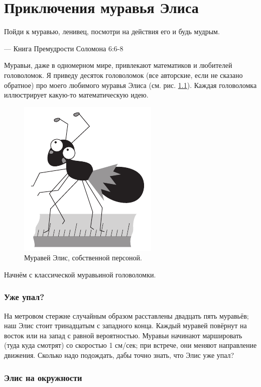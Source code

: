 \chapter{Приключения муравья Элиса}


\setlength{\epigraphwidth}{.67\textwidth}
\epigraph{Пойди к муравью, ленивец, посмотри на действия его и будь мудрым.
}{--- Книга Премудрости Соломона 6:6-8} 

Муравьи, даже в одномерном мире, привлекают математиков и любителей головоломок.
Я приведу десяток головоломок (все авторские, если не сказано обратное) про моего любимого муравья Элиса
(см. рис. \ref{pic:alice1}).
Каждая головоломка иллюстрирует какую-то математическую идею.

\begin{figure}[ht!]
\centering
\includegraphics[scale=.7]{pics/alice1}
\caption{Муравей Элис, собственной персоной.}
\label{pic:alice1}
\end{figure}

Начнём с классической муравьиной головоломки.

\subsection*{Уже упал?}\label{Уже упал?}

На метровом стержне случайным образом расставлены двадцать пять муравьёв; наш Элис стоит тринадцатым с западного конца.
Каждый муравей повёрнут на восток или на запад с равной вероятностью.
Муравьи начинают маршировать (туда куда смотрят) со скоростью 1 см/сек;
при встрече, они меняют направление движения.
Сколько надо подождать, дабы точно знать, что Элис уже упал?

\subsection*{Элис на окружности}\label{Элис на окружности}

